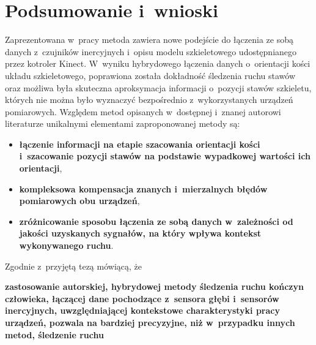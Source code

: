 \chapter{Podsumowanie i~wnioski }\label{chap:finalSummary}

Zaprezentowana w~pracy metoda zawiera nowe podejście do łączenia ze sobą danych z~czujników inercyjnych i~opisu modelu szkieletowego udostępnianego przez kotroler Kinect. W~wyniku hybrydowego łączenia danych o~orientacji kości układu szkieletowego, poprawiona została dokładność śledzenia ruchu stawów oraz możliwa była skuteczna aproksymacja informacji o~pozycji stawów szkieletu, których nie można było wyznaczyć bezpośrednio z~wykorzystanych urządzeń pomiarowych. Względem metod opisanych w~dostępnej i~znanej autorowi literaturze unikalnymi elementami zaproponowanej metody są:
\begin{itemize}
	\item \textbf{łączenie informacji na etapie szacowania orientacji kości i~szacowanie pozycji stawów na podstawie wypadkowej wartości ich orientacji},\\
	\item \textbf{kompleksowa kompensacja znanych i~mierzalnych błędów pomiarowych obu urządzeń}, \\
	\item \textbf{zróżnicowanie sposobu łączenia ze sobą danych w~zależności od jakości uzyskanych sygnałów, na który wpływa kontekst wykonywanego ruchu}.
\end{itemize}


Zgodnie z~przyjętą tezą mówiącą, że
\begin{center}
	\textbf{zastosowanie autorskiej, hybrydowej metody śledzenia ruchu kończyn człowieka, łączącej dane pochodzące z~sensora głębi i~sensorów inercyjnych, uwzględniającej kontekstowe charakterystyki pracy urządzeń, pozwala na bardziej precyzyjne, niż w~przypadku innych metod, śledzenie ruchu}
\end{center}

